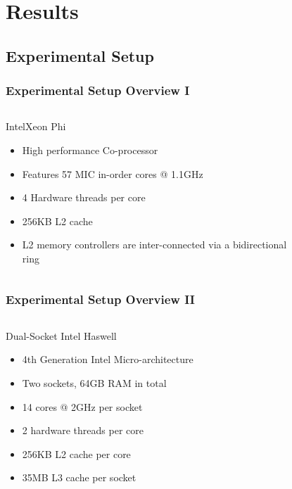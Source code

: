 \section{Results}

\subsection{Experimental Setup}
\begin{frame}
	\frametitle{Experimental Setup Overview I}
	\begin{columns}[c]
		\begin{block}{Intel\highr Xeon Phi\texttrademark{}}
		\begin{itemize}
			\item High performance Co-processor \footnotemark
			\item Features 57 MIC in-order cores @ 1.1GHz
			\item 4 Hardware threads per core
			\item 256KB L2 cache
			\item L2 memory controllers are inter-connected via a bidirectional ring
		\end{itemize}
		\end{block}
		
		\begin{figure}
		\end{figure}
		
	\end{columns}
\end{frame}


\begin{frame}
	\frametitle{Experimental Setup Overview II}
	\begin{columns}[c]
		\begin{block}{Dual-Socket Intel\highr{} Haswell}
			\begin{itemize}
				\item 4th Generation Intel Micro-architecture \footnotemark
				\item Two sockets, 64GB RAM in total
				\item 14 cores @ 2GHz per socket 
				\item 2 hardware threads per core
				\item 256KB L2 cache per core
				\item 35MB L3 cache per socket
			\end{itemize}
		\end{block}
		\begin{figure}
		\end{figure}
	\end{columns}
\end{frame}



